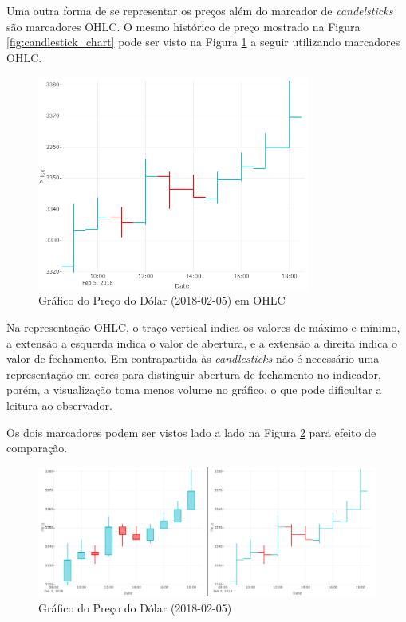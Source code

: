 \documentclass[12pt]{article}
\begin{document}
Uma outra forma de se representar os preços além do marcador de \textit{candelsticks}
são marcadores OHLC. O mesmo histórico de preço mostrado na Figura \ref{fig:candlestick_chart}
pode ser visto na Figura \ref{fig:ohlc_chart} a seguir utilizando marcadores OHLC.

\begin{figure}[H]
	\centering
	\includegraphics[width=0.8\textwidth]{ohlc_chart.png}
	\caption{Gráfico do Preço do Dólar (2018-02-05) em OHLC}
	\label{fig:ohlc_chart}
\end{figure}

Na representação OHLC, o traço vertical indica os valores de máximo e mínimo, a extensão
a esquerda indica o valor de abertura, e a extensão a direita indica o valor de fechamento.
Em contrapartida às \textit{candlesticks} não é necessário uma representação em cores para
distinguir abertura de fechamento no indicador, porém, a visualização toma menos volume no
gráfico, o que pode dificultar a leitura ao observador.

Os dois marcadores podem ser vistos lado a lado na Figura \ref{fig:chart_comp} para efeito
de comparação.

\begin{figure}[H]
	\centering
	\includegraphics[width=\textwidth]{chart_comp.png}
	\caption{Gráfico do Preço do Dólar (2018-02-05)}
	\label{fig:chart_comp}
\end{figure}
\end{document}
